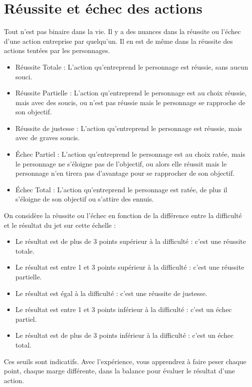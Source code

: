 \documentclass{conf/FusinaClass}
\begin{document}
\section{Réussite et échec des actions}
Tout n'est pas binaire dans la vie. Il y a des nuances dans la réussite ou l'échec d'une action entreprise par quelqu'un. Il en est de même dans la réussite des actions tentées par les personnages. 

\begin{itemize}
\item Réussite Totale : L'action qu'entreprend le personnage est réussie, sans aucun souci.
\item Réussite Partielle : L'action qu'entreprend le personnage est au choix réussie, mais avec des soucis, ou n'est pas réussie mais le personnage se rapproche de son objectif.
\item Réussite de justesse : L'action qu'entreprend le personnage est réussie, mais avec de graves soucis.
\item Échec Partiel : L'action qu'entreprend le personnage est au choix ratée, mais le personnage ne s'éloigne pas de l'objectif, ou alors elle réussit mais le personnage n'en tirera pas d'avantage pour se rapprocher de son objectif.
\item Échec Total : L'action qu'entreprend le personnage est ratée, de plus il s'éloigne de son objectif ou s'attire des ennuis.
\end{itemize}

On considère la réussite ou l'échec en fonction de la différence entre la difficulté et le résultat du jet sur cette échelle :

\begin{itemize}
\item Le résultat est de plus de 3 points supérieur à la difficulté : c'est une réussite totale.
\item Le résultat est entre 1 et 3 points supérieur à la difficulté : c'est une réussite partielle.
\item Le résultat est égal à la difficulté : c'est une réussite de justesse.
\item Le résultat est entre 1 et 3 points inférieur à la difficulté : c'est un échec partiel.
\item Le résultat est de plus de 3 points inférieur à la difficulté : c'est un échec total.
\end{itemize}

Ces seuils sont indicatifs. Avec l'expérience, vous apprendrez à faire peser chaque point, chaque marge différente, dans la balance pour évaluer le résultat d'une action.
\end{document}
